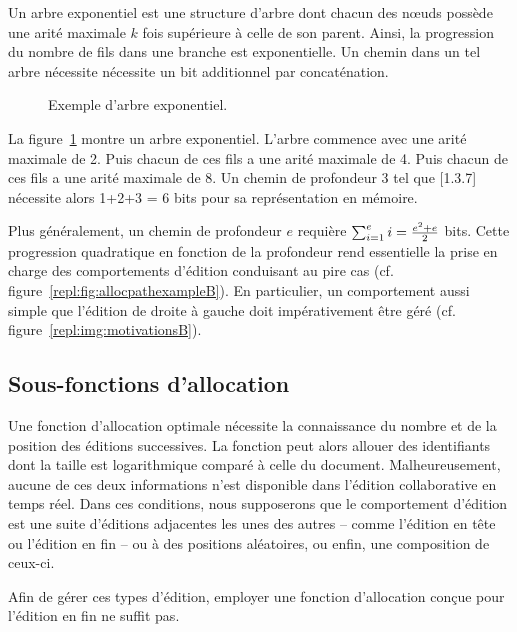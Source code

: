 Un arbre exponentiel est une structure d'arbre dont chacun des nœuds possède une
arité maximale $k$ fois supérieure à celle de son parent. Ainsi, la progression
du nombre de fils dans une branche est exponentielle. Un chemin dans un tel
arbre nécessite nécessite un bit additionnel par concaténation.

\begin{figure}
  \begin{center}
    
    \caption{\label{repl:fig:exponentialtree}Exemple d'arbre exponentiel.}
  \end{center}
\end{figure}

La figure~\ref{repl:fig:exponentialtree} montre un arbre exponentiel. L'arbre
commence avec une arité maximale de 2. Puis chacun de ces fils a une arité
maximale de 4. Puis chacun de ces fils a une arité maximale de 8. Un chemin de
profondeur 3 tel que [1.3.7] nécessite alors 1+2+3 = 6 bits pour sa
représentation en mémoire.

Plus généralement, un chemin de profondeur $e$ requière
$\textstyle\sum\nolimits_{i=1}^{e}i = {e^2 + e \over{2}}$ bits. Cette progression
quadratique en fonction de la profondeur rend essentielle la prise en charge des
comportements d'édition conduisant au pire cas
(cf. figure~\ref{repl:fig:allocpathexampleB}). En particulier, un comportement
aussi simple que l'édition de droite à gauche doit impérativement être géré
(cf. figure~\ref{repl:img:motivationsB}).

\subsection{Sous-fonctions d'allocation}
\label{repl:subsec:suballocation}

Une fonction d'allocation optimale nécessite la connaissance du nombre et de la
position des éditions successives. La fonction peut alors allouer des
identifiants dont la taille est logarithmique comparé à celle du
document. Malheureusement, aucune de ces deux informations n'est disponible dans
l'édition collaborative en temps réel. Dans ces conditions, nous supposerons que
le comportement d'édition est une suite d'éditions adjacentes les unes des
autres -- comme l'édition en tête ou l'édition en fin -- ou à des positions
aléatoires, ou enfin, une composition de ceux-ci.

Afin de gérer ces types d'édition, employer une fonction d'allocation conçue
pour l'édition en fin ne suffit pas. 

